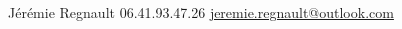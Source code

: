 \documentclass[lighthipster]{simplehipstercv}
\newlength{\rightcolwidth}
\begin{document}
\begin{paracol}{2}
\vfill{} %

\setlength{\parindent}{0pt}
\begin{minipage}[t]{\rightcolwidth}
\begin{center}\fontfamily{\sfdefault}\selectfont \color{black!70}
{\small Jérémie Regnault  06.41.93.47.26  \protect\url{jeremie.regnault@outlook.com}
}
\end{center}
\end{minipage}

\end{paracol}
\end{document}
